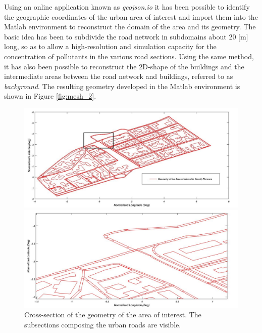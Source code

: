 \documentclass[journal]{IEEEtran}
\begin{document}
Using an online application known as \textit{geojson.io}  it has been possible to identify the geographic coordinates of the urban area of interest and import them into the Matlab environment to reconstruct the domain of the area and its geometry. The basic idea has been to subdivide the road network in subdomains about 20 [m] long, so as to allow a high-resolution and simulation capacity for the concentration of pollutants in the various road sections. Using the same method, it has also been possible to reconstruct the 2D-shape of the buildings and the intermediate areas between the road network and buildings, referred to as \textit{background}. The resulting geometry developed in the Matlab environment is shown in Figure \ref{fig:mesh_2}.
\begin{figure}[tbp]
	\centering
	\includegraphics[width=.5\textwidth]{figure/Geometria_novoli_2.jpg}
	\caption{Geometry of the area of interest in Novoli, Florence, showing streets and buildings. The rectangle with the black border focuses on a cross-section of the geometry (Figure \ref{fig:spaccatogeom}), in which it can be seen how the streets have been divided into subsections.}
	\label{fig:mesh_2}
		\centering
\hspace*{-0.2cm}   
	\includegraphics[width=.5\textwidth]{figure/spaccato_geo.jpg}
	\caption{Cross-section of the geometry of the area of interest. The subsections composing the urban roads are visible.}
	\label{fig:spaccatogeom}
\end{figure}
\end{document}
